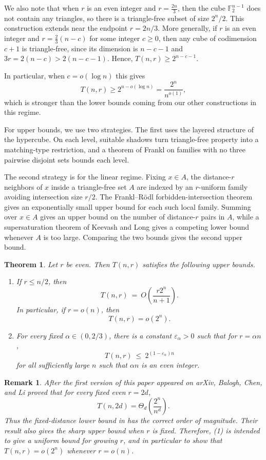 \documentclass[11pt]{article}
\theoremstyle{plain}
\newtheorem{theorem}{Theorem}
\newtheorem{remark}{Remark}
\newcommand{\F}{\mathbb{F}}
\begin{document}
We also note that when $r$ is an even integer and $r=\frac{2n}{3}$, then the cube $\F_2^{n-1}$ does not contain any triangles, so there is a triangle-free subset of size $2^n/2$.
This construction extends near the endpoint $r=2n/3$.
More generally, if $r$ is an even integer and $r=\frac{2}{3}(n-c)$ for some integer $c\ge 0$, then any cube of codimension $c+1$ is triangle-free, since its dimension is $n-c-1$ and $
3r=2(n-c)>2(n-c-1)$.
Hence, $T(n,r)\ge 2^{n-c-1}$.

In particular, when $c=o(\log n)$ this gives
\[
T(n,r)\ge 2^{n-o(\log n)}=\frac{2^n}{n^{o(1)}},
\]
which is stronger than the lower bounds coming from our other constructions in this regime.

For upper bounds, we use two strategies.
The first uses the layered structure of the hypercube.
On each level, suitable shadows turn triangle-free property into a matching-type restriction, and a theorem of Frankl on families with no three pairwise disjoint sets bounds each level.

The second strategy is for the linear regime.
Fixing $x\in A$, the distance-$r$ neighbors of $x$ inside a triangle-free set $A$ are indexed by an $r$-uniform family avoiding intersection size $r/2$.
The Frankl--R\"odl forbidden-intersection theorem \cite{frankl} gives an exponentially small upper bound for each such local family.
Summing over $x\in A$ gives an upper bound on the number of distance-$r$ pairs in $A$, while a supersaturation theorem of Keevash and Long \cite{KeevashLong} gives a competing lower bound whenever $A$ is too large.
Comparing the two bounds gives the second upper bound.

\begin{theorem}\label{thm:upper-main}
Let $r$ be even.
Then $T(n,r)$ satisfies the following upper bounds.

\begin{enumerate}
\item If $r\le n/2$, then
\[
T(n,r)\ =\ O\!\left(\frac{r2^n}{n+1}\right).
\]
In particular, if $r=o(n)$, then
\[
T(n,r)=o(2^n).
\]

\item For every fixed $\alpha\in(0,2/3)$, there is a constant $\varepsilon_\alpha>0$ such that for $r=\alpha n$, 
\[
T(n,r)\ \le\ 2^{(1-\varepsilon_\alpha)n}
\]
for all sufficiently large $n$ such that $\alpha n$ is an even integer.
\end{enumerate}
\end{theorem}

\begin{remark}
After the first version of this paper \cite{mukk} appeared on arXiv,
Balogh, Chen, and Li \cite{balogh} proved that for every fixed even
$r=2d$,
\[
T(n,2d)=\Theta_d\!\left(\frac{2^n}{n^d}\right).
\]
Thus the fixed-distance lower bound in  has the
correct order of magnitude.  Their result also gives the sharp upper
bound when $r$ is fixed.  Therefore, (1) is intended
to give a uniform bound for growing $r$, and in particular to show that
$T(n,r)=o(2^n)$ whenever $r=o(n)$.
\end{remark}
\end{document}
